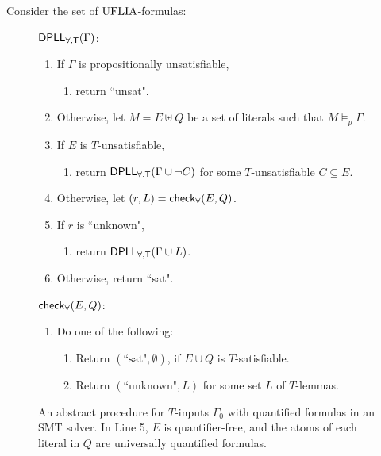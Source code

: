 \documentclass[oribibl]{llncs}
\begin{document}
\begin{example}
Consider the set of $\mathrm{UFLIA}$-formulas:

\end{example}

\begin{figure}[t]
\begin{framed}
\begin{internallinenumbers}
$\small\mathsf{DPLL_{\forall, T}}( \Gamma )$:
\begin{enumerate}
\item[\ ] If $\Gamma$ is propositionally unsatisfiable,
\begin{enumerate}
\item[\ ] return ``unsat".
\end{enumerate}
\item[\ ] Otherwise, let $M = E \uplus Q$ be a set of literals such that $M \models_p \Gamma$.
\item[\ ] If $E$ is $T$-unsatisfiable,
\begin{enumerate}
\item[\ ] return $\small\mathsf{DPLL_{\forall, T}}( \Gamma \cup \neg C )$ for some $T$-unsatisfiable $C \subseteq E$.
\end{enumerate}
\item[\ ] Otherwise, let $( r, L ) = \small\mathsf{check}_\forall( E, Q )$.
\item[\ ] If $r$ is ``unknown",
\begin{enumerate}
\item[\ ] return $\small\mathsf{DPLL_{\forall, T}}( \Gamma \cup L )$.
\end{enumerate}
\item[\ ] Otherwise, return ``sat".
\end{enumerate}
$\small\mathsf{check}_\forall( E, Q )$:
\begin{enumerate}
\item[\ ] Do one of the following:
\begin{enumerate}
\item[\ ] Return $( \text{``sat"}, \emptyset )$, if $E \cup Q$ is $T$-satisfiable.
\item[\ ] Return $( \text{``unknown"}, L )$ for some set $L$ of $T$-lemmas.
\end{enumerate}
\end{enumerate}
\end{internallinenumbers}
\end{framed}
\vspace{-2ex}
\caption{An abstract procedure for $T$-inputs $\Gamma_0$ with quantified formulas in an SMT solver.
In Line 5, $E$ is quantifier-free, and the atoms of each literal in $Q$ are universally quantified formulas.
\label{fig:smtq}}
\end{figure}
\end{document}
